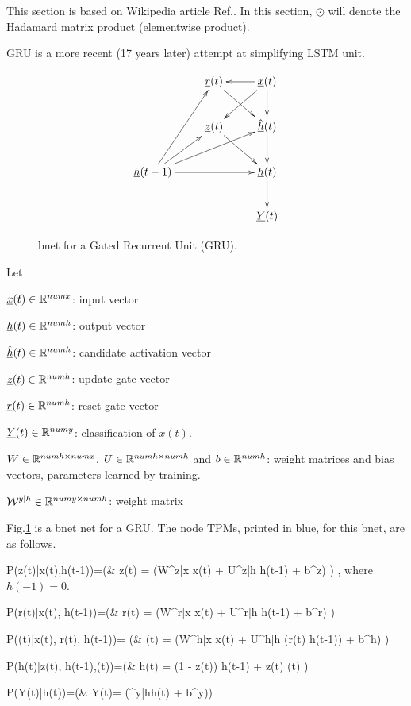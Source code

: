 This 
section is based 
on Wikipedia article Ref.\cite{gru}. In this section,
$\odot$
will denote the Hadamard matrix product
(elementwise product).

GRU is a more recent (17 years later)
attempt at simplifying LSTM unit.

\begin{figure}[h!]
\centering
$$\xymatrix{
&\rvr(t)\ar[dr]&\rvx(t)\ar[d]\ar[dl]\ar[l]
\\
&\rvz(t)\ar[dr]
&\hat{\rvh}(t)\ar[d]
\\
\rvh(t-1)\ar[ur]\ar[rr]\ar[urr]\ar[uur]
&&\rvh(t)\ar[d]
\\
&&\rvY(t)
}$$
\caption{bnet for a Gated
Recurrent Unit (GRU).}
\label{fig-rnn-gru}
\end{figure}

Let

${\underline{x}}(t)\in { \mathbb{R}}^{numx}$: input vector

${\underline{h}}(t)\in{ \mathbb{R}}^{numh}$: output vector

$\hat{{\underline{h}}}(t)\in{ \mathbb{R}}^{numh}$: candidate activation vector

${\underline{z}}(t)\in{ \mathbb{R}}^{numh}$: update gate vector

${\underline{r}}(t)\in{ \mathbb{R}}^{numh}$: reset gate vector

${\underline{Y}}(t)\in { \mathbb{R}}^{numy}$: 
classification of $x(t)$.

$W\in { \mathbb{R}}^{numh\times numx}$, 
$U\in { \mathbb{R}}^{numh\times numh}$
and 
$b\in { \mathbb{R}}^{numh}$: 
weight matrices and bias vectors,
 parameters learned by training.

${\cal W}^{y|h}\in { \mathbb{R}}^{numy\times numh}$:
 weight matrix

Fig.\ref{fig-rnn-gru}
is a bnet net
for a GRU.
The node TPMs, printed in blue,
for this bnet, are
as follows.


\beqa\color{blue}
P(z(t)|x(t),h(t-1))=\indi(\;\;\;&
z(t) = \sig(W^{z|x} x(t) + U^{z|h} h(t-1) + b^z)
\;\;\;)
\;,
\eeqa
where $h(-1)=0$.

\beqa\color{blue}
P(r(t)|x(t), h(t-1))=\indi(\;\;\;&
r(t) = \sig(W^{r|x} x(t) + U^{r|h} h(t-1) + b^r)
\;\;\;)
\eeqa

\beqa\color{blue}
P((t)|x(t), r(t), h(t-1))=
\indi(\;\;\;&
(t) = \tanh(W^{h|x} x(t) +
 U^{h|h} (r(t) \odot h(t-1)) + b^h)
\;\;\;)
\eeqa

\beqa\color{blue}
P(h(t)|z(t), h(t-1),(t))=\indi(\;\;\;&
h(t) =  (1 - z(t)) \odot h(t-1) +
 z(t) \odot {}(t)
\;\;\;)
\eeqa

\beqa\color{blue}
P(Y(t)|h(t))=\indi(\;\;\;&
Y(t)= \cala(\calw^{y|h}h(t) + b^y)\;\;\;)
\eeqa